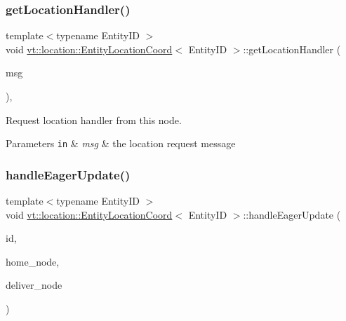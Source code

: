 \subsubsection{\texorpdfstring{get\+Location\+Handler()}{getLocationHandler()}}
{\footnotesize\ttfamily template$<$typename Entity\+ID $>$ \\
void \hyperlink{structvt_1_1location_1_1_entity_location_coord}{vt\+::location\+::\+Entity\+Location\+Coord}$<$ Entity\+ID $>$\+::get\+Location\+Handler (\begin{DoxyParamCaption}\item[{\hyperlink{structvt_1_1location_1_1_entity_location_coord_a8799cbd5fb0fb04cfdd1012fe1d5908f}{Loc\+Msg\+Type} $\ast$}]{msg }\end{DoxyParamCaption})\hspace{0.3cm}{\ttfamily [static]}, {\ttfamily [private]}}



Request location handler from this node. 


\begin{DoxyParams}[1]{Parameters}
\mbox{\tt in}  & {\em msg} & the location request message \\
\hline
\end{DoxyParams}
\mbox{\label{structvt_1_1location_1_1_entity_location_coord_a02337c5b5c23bf81b540568107103ef4}} 
\subsubsection{\texorpdfstring{handle\+Eager\+Update()}{handleEagerUpdate()}}
{\footnotesize\ttfamily template$<$typename Entity\+ID $>$ \\
void \hyperlink{structvt_1_1location_1_1_entity_location_coord}{vt\+::location\+::\+Entity\+Location\+Coord}$<$ Entity\+ID $>$\+::handle\+Eager\+Update (\begin{DoxyParamCaption}\item[{Entity\+ID const \&}]{id,  }\item[{\hyperlink{namespacevt_a866da9d0efc19c0a1ce79e9e492f47e2}{Node\+Type}}]{home\+\_\+node,  }\item[{\hyperlink{namespacevt_a866da9d0efc19c0a1ce79e9e492f47e2}{Node\+Type}}]{deliver\+\_\+node }\end{DoxyParamCaption})}



